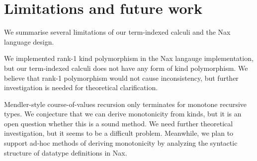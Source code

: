 
\section{Limitations and future work}\label{sec:concl:fw}
We summarise several limitations of our term-indexed calculi and
the Nax language design.

We implemented rank-1 kind polymorphism in the Nax langauge implementation,
but our term-indexed calculi does not have any form of kind polymorphism.
We believe that rank-1 polymorphism would not cause inconsistency, but
further investigation is needed for theoretical clarification.

Mendler-style course-of-values recursion only terminates for monotone
recursive types. We conjecture that we can derive monotonicity from kinds,
but it is an open question whether this is a sound method. We need further
theoretical investigation, but it seems to be a difficult problem.
Meanwhile, we plan to support ad-hoc methods of deriving monotonicity
by analyzing the syntactic structure of datatype definitions in Nax.

